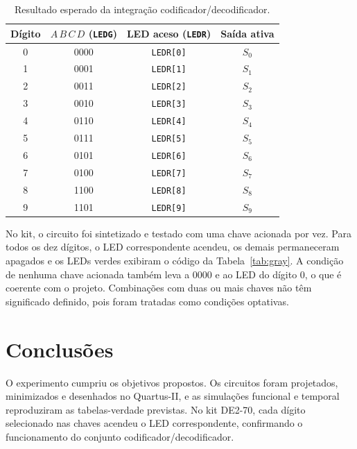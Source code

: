 \documentclass[12pt]{article}
\begin{document}
\begin{table}[H]
    \centering
    \caption{Resultado esperado da integração codificador/decodificador.}
    \label{tab:integrado}
    \begin{tabular}{|c|c|c|c|}
        \hline
        Dígito & $A\,B\,C\,D$ (\texttt{LEDG}) & LED aceso (\texttt{LEDR}) & Saída ativa \\
        \hline
        0 & 0000 & \texttt{LEDR[0]} & $S_0$ \\
        \hline
        1 & 0001 & \texttt{LEDR[1]} & $S_1$ \\
        \hline
        2 & 0011 & \texttt{LEDR[2]} & $S_2$ \\
        \hline
        3 & 0010 & \texttt{LEDR[3]} & $S_3$ \\
        \hline
        4 & 0110 & \texttt{LEDR[4]} & $S_4$ \\
        \hline
        5 & 0111 & \texttt{LEDR[5]} & $S_5$ \\
        \hline
        6 & 0101 & \texttt{LEDR[6]} & $S_6$ \\
        \hline
        7 & 0100 & \texttt{LEDR[7]} & $S_7$ \\
        \hline
        8 & 1100 & \texttt{LEDR[8]} & $S_8$ \\
        \hline
        9 & 1101 & \texttt{LEDR[9]} & $S_9$ \\
        \hline
    \end{tabular}
\end{table}

No kit, o circuito foi sintetizado e testado com uma chave acionada por vez. Para todos os dez dígitos, o LED correspondente acendeu, os demais permaneceram apagados e os LEDs verdes exibiram o código da Tabela~\ref{tab:gray}. A condição de nenhuma chave acionada também leva a $0000$ e ao LED do dígito 0, o que é coerente com o projeto. Combinações com duas ou mais chaves não têm significado definido, pois foram tratadas como condições optativas.

\section{Conclusões}
\label{sec:Conclusao}

O experimento cumpriu os objetivos propostos. Os circuitos foram projetados, minimizados e desenhados no Quartus-II, e as simulações funcional e temporal reproduziram as tabelas-verdade previstas. No kit DE2-70, cada dígito selecionado nas chaves acendeu o LED correspondente, confirmando o funcionamento do conjunto codificador/decodificador.
\end{document}
